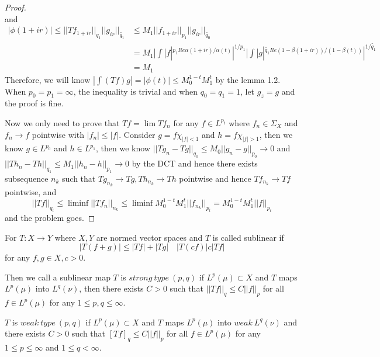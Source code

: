 \begin{proof}
\[    \]
    and
    \[
    \begin{aligned}
        |\phi(1+ir)| \leq ||Tf_{1+ir}||_{q_1}||g_{ir}||_{\tilde{q_1}} &\leq M_1 ||f_{1+ir}||_{p_1} ||g_{ir}||_{\tilde{q_0}} \\ &= M_1 |\int |f|^{p_1Re\alpha(1+ir)/\alpha(t)}|^{1/p_1}|\int |g|^{\tilde{q_1}Re(1-\beta(1+ir))/(1-\beta(t))}|^{1/\tilde{q_1}} \\
        &= M_1
    \end{aligned}
    \]
    Therefore, we will know $|\int (Tf)g| = |\phi(t)| \leq M_0^{1-t}M_1^t$ by the lemma 1.2. When $p_0 = p_1 = \infty$, the inequality is trivial and when $q_0 = q_1 = 1$, let $g_z = g$ and the proof is fine.\par
    Now we only need to prove that $Tf = \lim Tf_n$ for any $f\in L^{p_t}$ where $f_n \in \Sigma_X$ and $f_n \to f$ pointwise with $|f_n| \leq |f|$. Consider $g = f\chi_{|f|<1}$ and $h = f\chi_{|f|>1}$, then we know $g \in L^{p_0}$ and $h\in L^{p_1}$, then we know $||Tg_n - Tg||_{q_0} \leq M_0 ||g_n - g||_{p_0} \to 0$ and $||Th_n - Th||_{q_1} \leq M_1 ||h_n - h||_{p_1} \to 0$ by the DCT and hence there exists subsequence $n_k$ such that $Tg_{n_k} \to Tg, Th_{n_k} \to Th$ pointwise and hence $Tf_{n_k} \to Tf$ pointwise, and
    \[
    ||Tf||_{q_t} \leq \liminf ||Tf_n||_{n_k} \leq \liminf M_0^{1-t}M_1^t ||f_{n_k}||_{p_t} = M_0^{1-t}M_1^t ||f||_{p_t}
    \]
    and the problem goes.
\end{proof}

\begin{definition}
    For $T:X\to Y$ where $X,Y$ are normed vector spaces and $T$ is called sublinear if
    \[|T(f+g)| \leq |Tf|+|Tg| \quad |T(cf)| c|Tf|\]
    for any $f,g\in X,c>0$.\par
    Then we call a sublinear map $T$ is $strong\ type\ (p,q)$ if $L^p(\mu) \subset X$ and $T$ maps $L^p(\mu)$ into $L^q(\nu)$, then there exists $C>0$ such that $||Tf||_q \leq C||f||_p$ for all $f\in L^p(\mu)$ for any $1\leq p,q \leq \infty$.\par
    $T$ is $weak\ type\ (p,q)$ if $L^p(\mu)\subset X$ and $T$ maps $L^p(\mu)$ into $weak\ L^q(\nu)$ and there exists $C>0$ such that $[Tf]_q \leq C||f||_p$ for all $f\in L^p(\mu)$ for any $1\leq p \leq \infty$ and $1\leq q < \infty$. 
\end{definition}

